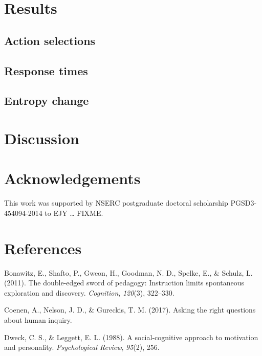\documentclass[10pt, letterpaper]{article}
\begin{document}
\section{Results}\label{results}

\subsection{Action selections}\label{action-selections}

\subsection{Response times}\label{response-times}

\subsection{Entropy change}\label{entropy-change}

\section{Discussion}\label{discussion}

\section{Acknowledgements}\label{acknowledgements}

This work was supported by NSERC postgraduate doctoral scholarship
PGSD3-454094-2014 to EJY \ldots{} FIXME.

\section{References}\label{references}

\setlength{\parindent}{-0.1in} \setlength{\leftskip}{0.125in} \noindent

\hypertarget{refs}{}
\hypertarget{ref-bonawitz2011}{}
Bonawitz, E., Shafto, P., Gweon, H., Goodman, N. D., Spelke, E., \&
Schulz, L. (2011). The double-edged sword of pedagogy: Instruction
limits spontaneous exploration and discovery. \emph{Cognition},
\emph{120}(3), 322--330.

\hypertarget{ref-coenen2017}{}
Coenen, A., Nelson, J. D., \& Gureckis, T. M. (2017). Asking the right
questions about human inquiry.

\hypertarget{ref-dweck1988}{}
Dweck, C. S., \& Leggett, E. L. (1988). A social-cognitive approach to
motivation and personality. \emph{Psychological Review}, \emph{95}(2),
256.
\end{document}
